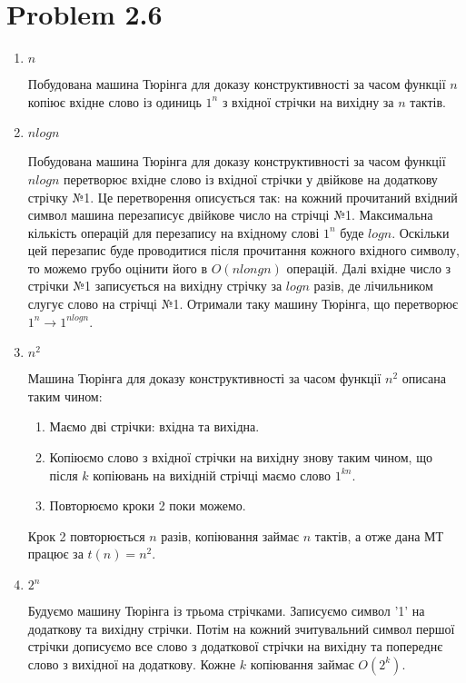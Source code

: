 \documentclass[12pt,letterpaper]{article}
\begin{document}
\section{Problem 2.6}

\begin{enumerate}
    \item \textbf{$n$}

        Побудована машина Тюрінга для доказу конструктивності за часом функції $n$
        копіює вхідне слово із одиниць $1^n$ з вхідної стрічки на вихідну за $n$ тактів.

    \item \textbf{$n log n$}

        Побудована машина Тюрінга для доказу конструктивності за часом функції $n log n$
        перетворює вхідне слово із вхідної стрічки у двійкове на додаткову стрічку №1.
        Це перетворення описується так: на кожний прочитаний вхідний символ машина
        перезаписує двійкове число на стрічці №1. Максимальна кількість операцій для
        перезапису на вхідному слові $1^n$ буде $log n$. Оскільки цей перезапис буде
        проводитися після прочитання кожного вхідного символу, то можемо грубо оцінити
        його в $O(n long n)$ операцій. Далі вхідне число з стрічки №1 записується на
        вихідну стрічку за $log n$ разів, де лічильником слугує слово на стрічці №1.
        Отримали таку машину Тюрінга, що перетворює $1^n \rightarrow 1^{n log n}$.


    \item \textbf{$n^2$}

        Машина Тюрінга для доказу конструктивності за часом функції $n^2$ описана таким
        чином:
        \begin{enumerate}
            \item Маємо дві стрічки: вхідна та вихідна.
            \item Копіюємо слово з вхідної стрічки на вихідну знову таким чином,
                що після $k$ копіювань на вихідній стрічці маємо слово $1^{kn}$.
            \item Повторюємо кроки 2 поки можемо.
        \end{enumerate}
        Крок 2 повторюється $n$ разів, копіювання займає $n$ тактів, а отже дана
        МТ працює за $t(n) = n^2$.

    \item \textbf{$2^n$}

        Будуємо машину Тюрінга із трьома стрічками. Записуємо символ '1' на додаткову
        та вихідну стрічки. Потім на кожний зчитувальний символ першої стрічки дописуємо
        все слово з додаткової стрічки на вихідну та попереднє слово з вихідної на
        додаткову. Кожне $k$ копіювання займає $O(2^k)$.

\end{enumerate}
\end{document}
